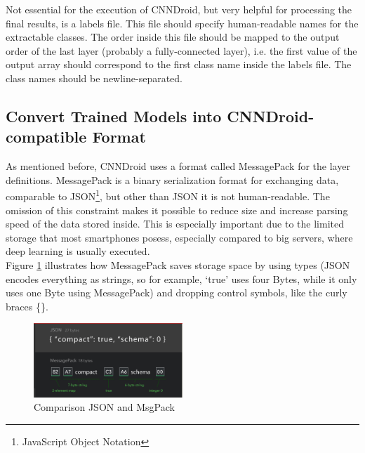 Not essential for the execution of CNNDroid, but very helpful for processing the final results, is a labels file. This file should specify human-readable names for the extractable classes. The order inside this file should be mapped to the output order of the last layer (probably a fully-connected layer), i.e. the first value of the output array should correspond to the first class name inside the labels file. The class names should be newline-separated.

\subsection{Convert Trained Models into CNNDroid-compatible Format}
As mentioned before, CNNDroid uses a format called MessagePack for the layer definitions. MessagePack is a binary serialization format for exchanging data, comparable to JSON\footnote{JavaScript Object Notation}, but other than JSON it is not human-readable. The omission of this constraint makes it possible to reduce size and increase parsing speed of the data stored inside. This is especially important due to the limited storage that most smartphones posess, especially compared to big servers, where deep learning is usually executed.\\
Figure \ref{fig:json_vs_msgpack} illustrates how MessagePack saves storage space by using types (JSON encodes everything as strings, so for example, `true' uses four Bytes, while it only uses one Byte using MessagePack) and dropping control symbols, like the curly braces \{\}.

\begin{figure}[H]
  \centering
    \includegraphics[width=0.5\textwidth]{json_vs_msgpack.png}
  \caption{Comparison JSON and MsgPack}
  \label{fig:json_vs_msgpack}
\end{figure}

